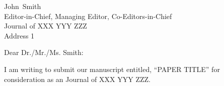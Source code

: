 \documentclass{cover-letter}
\def\EditorFirstName{John}
\def\EditorLastName{Smith}
\def\EditorName{\EditorFirstName~\EditorLastName}
\def\EditorTitle{Editor-in-Chief, Managing Editor, Co-Editors-in-Chief}
\def\JournalName{Journal of XXX YYY ZZZ} %
\def\JournalAddress{Address 1} %
\def\PaperTitle{PAPER TITLE}
\begin{document}
\begin{letter}{\EditorName \\ \EditorTitle \\ \JournalName \\ \JournalAddress}

\opening{Dear Dr./Mr./Ms. \EditorLastName:}





I am writing to submit our manuscript entitled, ``\PaperTitle'' for consideration as an \JournalName.




\end{letter}
\end{document}
